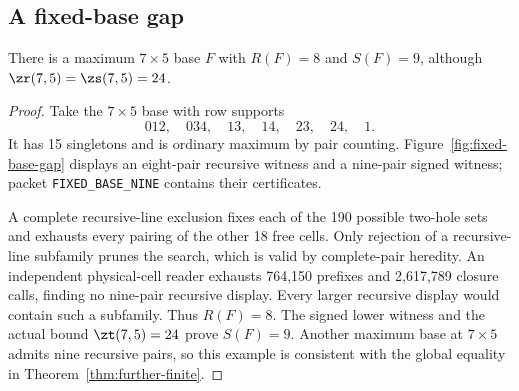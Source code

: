 \subsection{A fixed-base gap}\label{sec:fixed-gap}
\begin{proposition}\label{prop:fixed-base-gap}
There is a maximum $7\times5$ base $F$ with $R(F)=8$ and $S(F)=9$,
although $\zr(7,5)=\zs(7,5)=24$.
\end{proposition}
\begin{proof}
Take the $7\times5$ base with row supports
\[
 012,\quad034,\quad13,\quad14,\quad23,\quad24,\quad1.
\]
It has 15 singletons and is ordinary maximum by pair counting.
Figure~\ref{fig:fixed-base-gap} displays an eight-pair recursive witness
and a nine-pair signed witness; packet \texttt{FIXED\_BASE\_NINE} contains their certificates.

 A complete recursive-line exclusion fixes each of the 190
possible two-hole sets and exhausts every pairing of the other 18 free
cells. Only rejection of a recursive-line subfamily prunes the search,
which is valid by complete-pair heredity. An independent physical-cell
reader exhausts 764,150 prefixes and 2,617,789 closure calls, finding
no nine-pair recursive display. Every larger recursive display would
contain such a subfamily. Thus $R(F)=8$. The signed lower witness and
the actual bound $\zt(7,5)=24$ prove $S(F)=9$.
Another maximum base at $7\times5$ admits nine recursive pairs, so
this example is consistent with the global equality in
Theorem~\ref{thm:further-finite}.

\end{proof}

